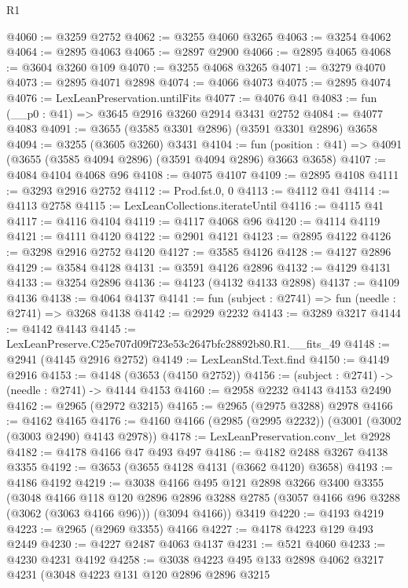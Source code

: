 \begin{lexlean}{R1}
\begin{coremodule}
@4060 := @3259 @2752
@4062 := @3255 @4060 @3265
@4063 := @3254 @4062
@4064 := @2895 @4063
@4065 := @2897 @2900
@4066 := @2895 @4065
@4068 := @3604 @3260 @109
@4070 := @3255 @4068 @3265
@4071 := @3279 @4070
@4073 := @2895 @4071 @2898
@4074 := @4066 @4073
@4075 := @2895 @4074
@4076 := LexLeanPreservation.untilFits
@4077 := @4076 @41
@4083 := fun (__p0 : @41) => @3645 @2916 @3260 @2914 @3431 @2752
@4084 := @4077 @4083
@4091 := @3655 (@3585 @3301 @2896) (@3591 @3301 @2896) @3658
@4094 := @3255 (@3605 @3260) @3431
@4104 := fun (position : @41) => @4091 (@3655 (@3585 @4094 @2896) (@3591 @4094 @2896) @3663 @3658)
@4107 := @4084 @4104 @4068 @96
@4108 := @4075 @4107
@4109 := @2895 @4108
@4111 := @3293 @2916 @2752
@4112 := Prod.fst.{0, 0}
@4113 := @4112 @41
@4114 := @4113 @2758
@4115 := LexLeanCollections.iterateUntil
@4116 := @4115 @41
@4117 := @4116 @4104
@4119 := @4117 @4068 @96
@4120 := @4114 @4119
@4121 := @4111 @4120
@4122 := @2901 @4121
@4123 := @2895 @4122
@4126 := @3298 @2916 @2752 @4120
@4127 := @3585 @4126
@4128 := @4127 @2896
@4129 := @3584 @4128
@4131 := @3591 @4126 @2896
@4132 := @4129 @4131
@4133 := @3254 @2896
@4136 := @4123 (@4132 @4133 @2898)
@4137 := @4109 @4136
@4138 := @4064 @4137
@4141 := fun (subject : @2741) => fun (needle : @2741) => @3268 @4138
@4142 := @2929 @2232
@4143 := @3289 @3217
@4144 := @4142 @4143
@4145 := LexLeanPreserve.C25e707d09f723e53c2647bfc28892b80.R1.__fits_49
@4148 := @2941 (@4145 @2916 @2752)
@4149 := LexLeanStd.Text.find
@4150 := @4149 @2916
@4153 := @4148 (@3653 (@4150 @2752))
@4156 := (subject : @2741) -> (needle : @2741) -> @4144 @4153
@4160 := @2958 @2232 @4143 @4153 @2490
@4162 := @2965 (@2972 @3215)
@4165 := @2965 (@2975 @3288) @2978
@4166 := @4162 @4165
@4176 := @4160 @4166 (@2985 (@2995 @2232)) (@3001 (@3002 (@3003 @2490) @4143 @2978))
@4178 := LexLeanPreservation.conv_let @2928
@4182 := @4178 @4166 @47 @493 @497
@4186 := @4182 @2488 @3267 @4138 @3355
@4192 := @3653 (@3655 @4128 @4131 (@3662 @4120) @3658)
@4193 := @4186 @4192
@4219 := @3038
    @4166
    @495
    @121
    @2898
    @3266
    @3400
    @3355
    (@3048
      @4166
      @118
      @120
      @2896
      @2896
      @3288
      @2785
      (@3057 @4166 @96 @3288 (@3062 (@3063 @4166 @96)))
      (@3094 @4166))
    @3419
@4220 := @4193 @4219
@4223 := @2965 (@2969 @3355) @4166
@4227 := @4178 @4223 @129 @493 @2449
@4230 := @4227 @2487 @4063 @4137
@4231 := @521 @4060
@4233 := @4230 @4231 @4192
@4258 := @3038
    @4223
    @495
    @133
    @2898
    @4062
    @3217
    @4231
    (@3048
      @4223
      @131
      @120
      @2896
      @2896
      @3215

\end{coremodule}
\end{lexlean}
